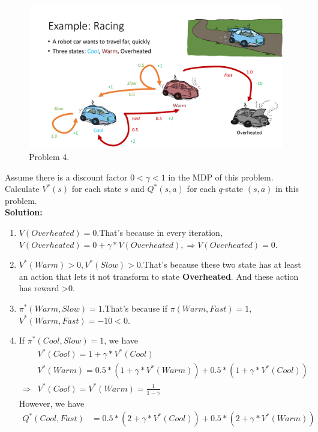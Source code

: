 \documentclass{article}
\begin{document}
\begin{enumerate}
    	\begin{figure}[h]
    	    \centering
    	    \includegraphics[width=12cm]{figs/fig_p4.pdf}
    	    \caption{Problem 4.}
    	    \label{fig:p4}
    	\end{figure}
    	Assume there is a discount factor $0<\gamma <1$ in the MDP of this problem. Calculate $V^\ast (s)$ for each state $s$ and $Q^\ast (s,a)$ for each $q$-state $(s,a)$ in this problem.\\
    \textbf{Solution:}
    \begin{enumerate}
        \item $V(Overheated)=0$.That's because in every iteration, $V(Overheated)=0+\gamma*V(Overheated),\Rightarrow V(Overheated)=0$.
        \item $V^*(Warm)>0, V^*(Slow)>0$.That's because these two state has at least an action that lets it not transform to state \textbf{Overheated}. And these action has reward >0.
        \item $\pi^*(Warm,Slow)=1$.That's because if $\pi(Warm,Fast)=1$, $V^*(Warm,Fast)=-10<0$.
        \item If $\pi^*(Cool,Slow)=1$, we have
        \begin{equation}
            \begin{aligned}
            &V^*(Cool)=1+\gamma*V^*(Cool)\\
            &V^*(Warm)=0.5*(1+\gamma*V^*(Warm))+0.5*(1+\gamma*V^*(Cool))\\
            \Rightarrow& V^*(Cool)=V^*(Warm)=\frac{1}{1-\gamma}
            \end{aligned}
        \end{equation}
        However, we have
        \begin{equation}
            \begin{aligned}
            Q^*(Cool,Fast)&=0.5*(2+\gamma*V^*(Cool))+0.5*(2+\gamma*V^*(Warm))\\

\end{aligned}
\end{equation}
\end{enumerate}
\end{enumerate}
\end{document}

